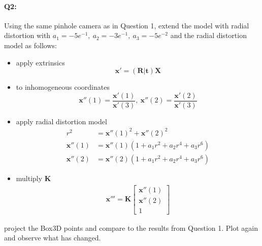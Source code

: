 \documentclass[a4paper]{article}
\begin{document}
\paragraph{Q2:} 
Using the same pinhole camera as in Question 1, extend the model with radial distortion with $a_1 = -5e^{-1},\ a_2 = -3e^{-1},\ a_3 = -5e^{-2}$ and the radial distortion model as follows:
\begin{itemize}
\item apply extrinsics $$ \mathbf{x}' = \left(\mathbf{R} | \mathbf{t}\right) \mathbf{X} $$ 
\item to inhomogeneous coordinates
$$
\mathbf{x}''(1)=\frac{\mathbf{x}'(1)}{\mathbf{x}'(3)},\ \mathbf{x}''(2)=\frac{\mathbf{x}'(2)}{\mathbf{x}'(3)}
$$
\item apply radial distortion model
\begin{align*}
r^2 &= \mathbf{x}''(1)^2+\mathbf{x}''(2)^2 \\
\mathbf{x}''(1) &= \mathbf{x}''(1)(1+a_1r^2+a_2r^4+a_3r^6) \\
\mathbf{x}''(2) &= \mathbf{x}''(2)(1+a_1r^2+a_2r^4+a_3r^6)
\end{align*}
\item multiply $\mathbf{K}$
\begin{align*}
\mathbf{x}''' = \mathbf{K}\left[
\begin{matrix}
\mathbf{x}''(1) \\ \mathbf{x}''(2) \\ 1
\end{matrix}
\right]
\end{align*}

\end{itemize}
project the Box3D points and compare to the results from Question 1. Plot again and observe what has changed.
\end{document}
